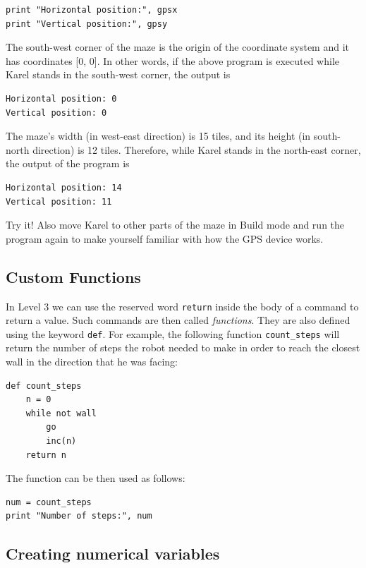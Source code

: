 {{{{\begin{verbatim}
print "Horizontal position:", gpsx
print "Vertical position:", gpsy
\end{verbatim}
The south-west corner of the maze is the origin of the coordinate system and it has 
coordinates [0, 0]. In other words, if the above program is executed while Karel stands 
in the south-west corner, the output is

\begin{verbatim}
Horizontal position: 0
Vertical position: 0
\end{verbatim}
The maze's width (in west-east direction) is 15 tiles, and its height (in south-north direction) 
is 12 tiles. Therefore, while Karel stands in the north-east corner, the output of the program is
\begin{verbatim}
Horizontal position: 14
Vertical position: 11
\end{verbatim}
Try it! Also move Karel to other parts of the maze in Build mode and run the program again
to make yourself familiar with how the GPS device works.

\subsection{Custom Functions}

In Level 3 we can use the reserved word {\tt return} inside the body of
a command to return a value. Such commands are then called {\em functions}. 
They are also defined using the keyword {\tt def}. For example, the following function
{\tt count\_steps} will return the number of steps the robot needed to 
make in order to reach the closest wall in the direction that he was facing:

\begin{verbatim}
def count_steps
    n = 0
    while not wall
        go
        inc(n)
    return n
\end{verbatim}
The function can be then used as follows:

\begin{verbatim}
num = count_steps
print "Number of steps:", num 
\end{verbatim}

\subsection{Creating numerical variables} \label{par:var}

}}}}
